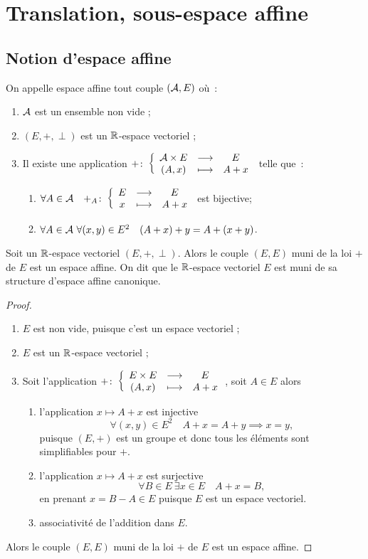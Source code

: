 \section{Translation, sous-espace affine}

\subsection{Notion d'espace affine}

\begin{defdef}
  On appelle espace affine tout couple $(\mathcal{A},E)$ où~:
  \begin{enumerate}
  \item $\mathcal{A}$ est un ensemble non vide ;
  \item $(E,+,\perp)$ est un $\mathbb{R}$-espace vectoriel ;
  \item Il existe une application $+\colon \left\{\begin{array}{ccc} \mathcal{A}\times E & \longrightarrow &E\\ (A,x) & \longmapsto & A+x \end{array} \right.$ telle que~:
    \begin{enumerate}
    \item $\forall A \in \mathcal{A} \quad +_A\colon \left\{\begin{array}{ccc} E & \longrightarrow &E\\ x & \longmapsto & A+x \end{array} \right.$ est bijective;
    \item $\forall A \in \mathcal{A} \ \forall (x,y) \in E^2 \quad (A+x)+y = A+(x+y)$.
    \end{enumerate}
  \end{enumerate}
\end{defdef}

\begin{prop}
  Soit un $\mathbb{R}$-espace vectoriel $(E,+,\perp)$. Alors le couple $(E,E)$ muni de la loi $+$ de $E$ est un espace affine. On dit que le $\mathbb{R}$-espace vectoriel $E$ est muni de sa structure d'espace affine canonique.
\end{prop}
\begin{proof}
  \begin{enumerate}
  \item $E$ est non vide, puisque c'est un espace vectoriel ;
  \item $E$ est un $\mathbb{R}$-espace vectoriel ;
  \item Soit l'application $+\colon \left\{\begin{array}{ccc} E\times E & \longrightarrow &E\\ (A,x) & \longmapsto & A+x \end{array} \right.$, soit $A \in E$ alors
    \begin{enumerate}
    \item l'application $x \longmapsto A+x$ est injective
      \begin{equation}
        \forall (x,y) \in E^2 \quad A+x=A+y \implies x=y,
      \end{equation}
      puisque $(E,+)$ est un groupe et donc tous les éléments sont simplifiables pour $+$.
    \item l'application $x \longmapsto A+x$ est surjective
      \begin{equation}
        \forall B \in E \ \exists x \in E \quad A+x=B,
      \end{equation}
      en prenant $x=B-A \in E$ puisque $E$ est un espace vectoriel.
    \item associativité de l'addition dans $E$.
    \end{enumerate}
  \end{enumerate}
  Alors le couple $(E,E)$ muni de la loi $+$ de $E$ est un espace affine.
\end{proof}

